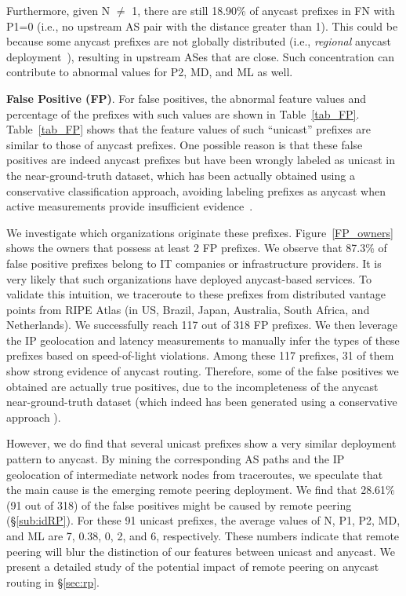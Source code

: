 Furthermore, given N $\neq$ 1, there are still 18.90\% of anycast prefixes in FN with P1=0 (i.e., no upstream AS pair with the distance greater than 1).
This could be because some anycast prefixes are not globally distributed (i.e., \textit{regional} anycast deployment~\cite{hao2018}), resulting in upstream ASes that are close. Such concentration can contribute to abnormal values for P2, MD, and ML as well.


\vspace{2pt}
\textbf{False Positive (FP)}. For false positives, the abnormal feature values and percentage of the prefixes with such values are shown in Table~\ref{tab_FP}. Table~\ref{tab_FP} shows that the feature values of such ``unicast'' prefixes are similar to those of anycast prefixes.
One possible reason is that these false positives are indeed anycast prefixes
but have been wrongly labeled as unicast in the near-ground-truth dataset, which has been actually obtained using a conservative classification approach, avoiding labeling prefixes as anycast when active measurements provide insufficient evidence~\cite{cicalese2015characterizing}.

We investigate which organizations originate these prefixes. Figure~\ref{FP_owners} shows the owners that possess at least 2 FP prefixes. We observe that 87.3\% of false positive prefixes belong to IT companies or infrastructure providers. It is very likely that such organizations have deployed anycast-based services. To validate this intuition, we traceroute to these prefixes from distributed vantage points from RIPE Atlas (in US, Brazil, Japan, Australia, South Africa, and Netherlands). We successfully reach 117 out of 318 FP prefixes. We then leverage the IP geolocation and latency measurements to manually infer the types of these prefixes based on speed-of-light violations. Among these 117 prefixes, 31 of them show strong evidence of anycast routing. Therefore, some of the false positives we obtained are actually true positives, due to the incompleteness of the anycast near-ground-truth dataset (which indeed has been generated using a conservative approach \cite{cicalese2015characterizing}).

However, we do find that several unicast prefixes show a very similar deployment pattern to anycast. By mining the corresponding AS paths and the IP geolocation of intermediate network nodes from traceroutes, we speculate that the main cause is the emerging remote peering deployment. We find that 28.61\% (91 out of 318) of the false positives might be caused by remote peering (\S\ref{sub:idRP}). For these 91 unicast prefixes, the average values of {\sf N}, {\sf P1},  {\sf P2}, {\sf MD}, and {\sf ML} are 7, 0.38, 0, 2, and 6, respectively. These numbers indicate that remote peering will blur the distinction of our features between unicast and anycast. We present a detailed study of the potential impact of remote peering on anycast routing in \S\ref{sec:rp}.

